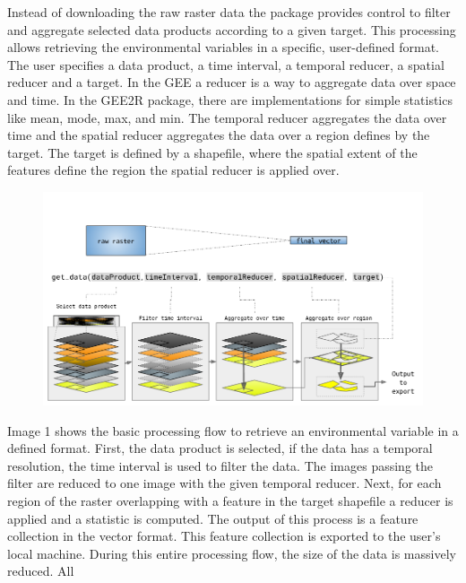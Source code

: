 \documentclass[11pt,twoside,a4paper,final]{report}
\begin{document}
Instead of downloading the raw raster data the package provides control to filter and aggregate selected data products according to a given target. This processing allows retrieving the environmental variables in a specific, user-defined format. The user specifies a data product,  a time interval, a temporal reducer, a spatial reducer and a target. In the GEE a reducer is a way to aggregate data over space and time. In the GEE2R package, there are implementations for simple statistics like mean, mode, max, and min. The temporal reducer aggregates the data over time and the spatial reducer aggregates the data over a region defines by the target. 
The target is defined by a shapefile, where the spatial extent of the features define the region the spatial reducer is applied over.

\begin{center}

   \begin{figure}[h]
     \begin{center}
       \includegraphics[width=15cm]{images/design_function.pdf}
    \end{center}
  \end{figure}
\end{center}

Image 1 shows the basic processing flow to retrieve an environmental variable in a defined format. First, the data product is selected, if the data has a temporal resolution, the time interval is used to filter the data. The images passing the filter are reduced to one image with the given temporal reducer. Next, for each region of the raster overlapping with a feature in the target shapefile a reducer is applied and a statistic is computed. The output of this process is a feature collection in the vector format. This feature collection is exported to the user's local machine.
During this entire processing flow, the size of the data is massively reduced. All 
\end{document}
